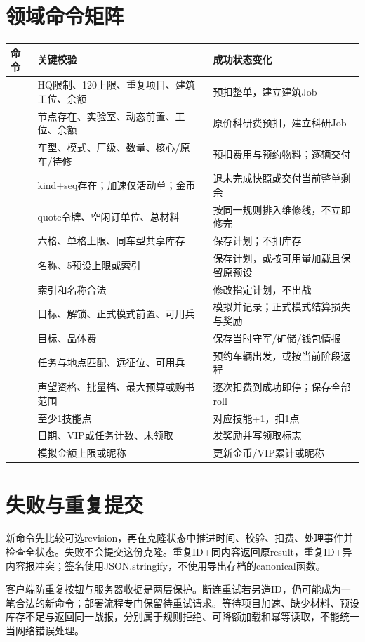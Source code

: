 \section{领域命令矩阵}
\begin{small}\begin{longtable}{@{}P{37mm}P{49mm}P{58mm}@{}}
\toprule 命令 & 关键校验 & 成功状态变化\\\midrule\endhead
{} & HQ限制、120上限、重复项目、建筑工位、余额 & 预扣整单，建立建筑Job\\
 & 节点存在、实验室、动态前置、工位、余额 & 原价科研费预扣，建立科研Job\\
 & 车型、模式、厂级、数量、核心/原车/待修 & 预扣费用与预约物料；逐辆交付\\
 & kind+seq存在；加速仅活动单；金币 & 退未完成快照或交付当前整单剩余\\
 & quote令牌、空闲订单位、总材料 & 按同一规则排入维修线，不立即修完\\
 & 六格、单格上限、同车型共享库存 & 保存计划；不扣库存\\
 & 名称、5预设上限或索引 & 保存计划，或按可用量加载且保留原预设\\
 & 索引和名称合法 & 修改指定计划，不出战\\
 & 目标、解锁、正式模式前置、可用兵 & 模拟并记录；正式模式结算损失与奖励\\
 & 目标、晶体费 & 保存当时守军/矿储/钱包情报\\
 & 任务与地点匹配、远征位、可用兵 & 预约车辆出发，或按当前阶段返程\\
 & 声望资格、批量档、最大预算或购书范围 & 逐次扣费到成功即停；保存全部roll\\
 & 至少1技能点 & 对应技能+1，扣1点\\
 & 日期、VIP或任务计数、未领取 & 发奖励并写领取标志\\
 & 模拟金额上限或昵称 & 更新金币/VIP累计或昵称\\
\bottomrule\end{longtable}\end{small}

\section{失败与重复提交}
新命令先比较可选revision，再在克隆状态中推进时间、校验、扣费、处理事件并检查全状态。失败不会提交这份克隆。重复ID+同内容返回原result，重复ID+异内容报冲突；签名使用JSON.stringify，不使用导出存档的canonical函数。

客户端防重复按钮与服务器收据是两层保护。断连重试若另造ID，仍可能成为一笔合法的新命令；部署流程专门保留待重试请求。等待项目加速、缺少材料、预设库存不足与返回同一战报，分别属于规则拒绝、可降额加载和幂等读取，不能统一当网络错误处理。
